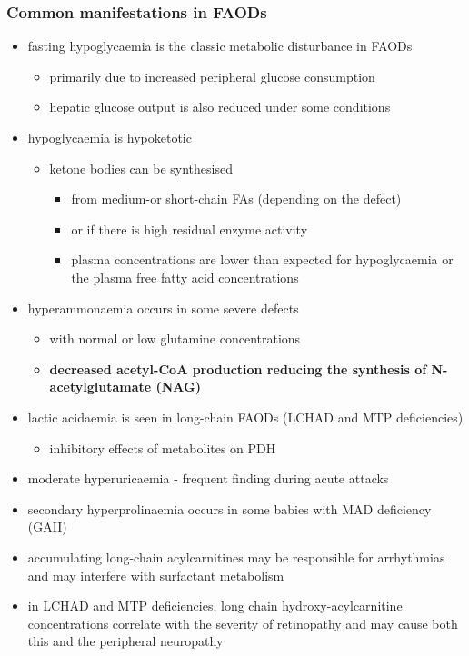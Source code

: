 \documentclass{scrartcl}
\begin{document}
\subsubsection{Common manifestations in FAODs}
\label{sec:org4737fe7}
\begin{itemize}
\item fasting hypoglycaemia is the classic metabolic disturbance in FAODs
\begin{itemize}
\item primarily due to increased peripheral glucose consumption
\item hepatic glucose output is also reduced under some conditions
\end{itemize}
\item hypoglycaemia is hypoketotic
\begin{itemize}
\item ketone bodies can be synthesised
\begin{itemize}
\item from medium-or short-chain FAs (depending on the defect)
\item or if there is high residual enzyme activity
\item plasma concentrations are lower than expected for hypoglycaemia or the plasma free fatty acid concentrations
\end{itemize}
\end{itemize}
\item hyperammonaemia occurs in some severe defects
\begin{itemize}
\item with normal or low glutamine concentrations
\item \textbf{decreased acetyl-CoA production reducing the synthesis of N-acetylglutamate (NAG)}
\end{itemize}
\item lactic acidaemia is seen in long-chain FAODs (LCHAD and MTP deficiencies)
\begin{itemize}
\item inhibitory effects of metabolites on PDH
\end{itemize}
\item moderate hyperuricaemia - frequent finding during acute attacks
\item secondary hyperprolinaemia occurs in some babies with MAD deficiency (GAII)
\item accumulating long-chain acylcarnitines may be responsible for
arrhythmias and may interfere with surfactant metabolism
\item in LCHAD and MTP deficiencies, long chain hydroxy-acylcarnitine
concentrations correlate with the severity of retinopathy and may
cause both this and the peripheral neuropathy
\end{itemize}
\end{document}
